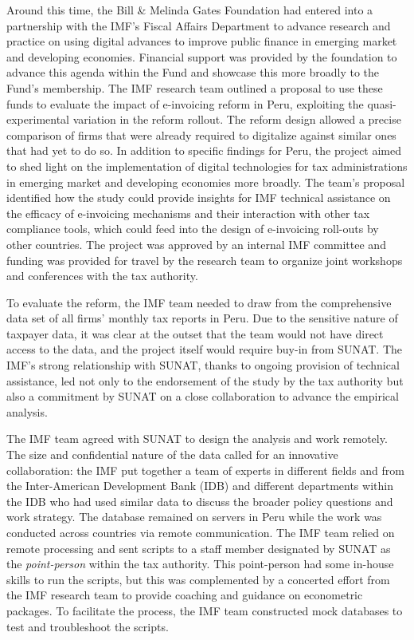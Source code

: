 Around this time, the Bill \& Melinda Gates Foundation had entered into a partnership with the IMF's Fiscal Affairs Department to advance research and practice on using digital advances to improve public finance in emerging market and developing economies. Financial support was provided by the foundation to advance this agenda within the Fund and showcase this more broadly to the Fund's membership. The IMF research team outlined a proposal to use these funds to evaluate the impact of e-invoicing reform in Peru, exploiting the quasi-experimental variation in the reform rollout. The reform design allowed a precise comparison of firms that were already required to digitalize against similar ones that had yet to do so. In addition to specific findings for Peru, the project aimed to shed light on the implementation of digital technologies for tax administrations in emerging market and developing economies more broadly. The team's proposal identified how the study could provide insights for IMF technical assistance on the efficacy of e-invoicing mechanisms and their interaction with other tax compliance tools, which could feed into the design of e-invoicing roll-outs by other countries. The project was approved by an internal IMF committee and funding was provided for travel by the research team to organize joint workshops and conferences with the tax authority.

To evaluate the reform, the IMF team needed to draw from the comprehensive data set of all firms' monthly tax reports in Peru. Due to the sensitive nature of taxpayer data, it was clear at the outset that the team would not have direct access to the data, and the project itself would require buy-in from SUNAT. The IMF's strong relationship with SUNAT, thanks to ongoing provision of technical assistance, led not only to the endorsement of the study by the tax authority but also a commitment by SUNAT on a close collaboration to advance the empirical analysis.

The IMF team agreed with SUNAT to design the analysis and work remotely. The size and confidential nature of the data called for an innovative collaboration: the IMF put together a team of experts in different fields and from the Inter-American Development Bank (IDB) and different departments within the IDB who had used similar data to discuss the broader policy questions and work strategy. The database remained on servers in Peru while the work was conducted across countries via remote communication. The IMF team relied on remote processing and sent scripts to a staff member designated by SUNAT as the \emph{point-person} within the tax authority. This point-person had some in-house skills to run the scripts, but this was complemented by a concerted effort from the IMF research team to provide coaching and guidance on econometric packages. To facilitate the process, the IMF team constructed mock databases to test and troubleshoot the scripts.

